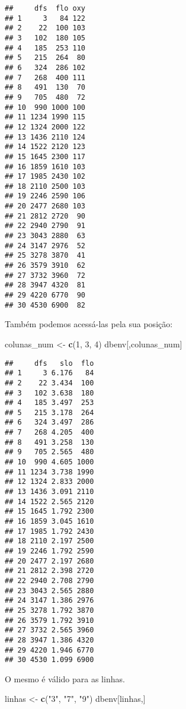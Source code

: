\documentclass[
]{book}
\newenvironment{Shaded}{\begin{snugshade}}{\end{snugshade}}
\newcommand{\DecValTok}[1]{\textcolor[rgb]{0.00,0.00,0.81}{#1}}
\newcommand{\KeywordTok}[1]{\textcolor[rgb]{0.13,0.29,0.53}{\textbf{#1}}}
\newcommand{\NormalTok}[1]{#1}
\newcommand{\StringTok}[1]{\textcolor[rgb]{0.31,0.60,0.02}{#1}}
\begin{document}
\begin{verbatim}
##     dfs  flo oxy
## 1     3   84 122
## 2    22  100 103
## 3   102  180 105
## 4   185  253 110
## 5   215  264  80
## 6   324  286 102
## 7   268  400 111
## 8   491  130  70
## 9   705  480  72
## 10  990 1000 100
## 11 1234 1990 115
## 12 1324 2000 122
## 13 1436 2110 124
## 14 1522 2120 123
## 15 1645 2300 117
## 16 1859 1610 103
## 17 1985 2430 102
## 18 2110 2500 103
## 19 2246 2590 106
## 20 2477 2680 103
## 21 2812 2720  90
## 22 2940 2790  91
## 23 3043 2880  63
## 24 3147 2976  52
## 25 3278 3870  41
## 26 3579 3910  62
## 27 3732 3960  72
## 28 3947 4320  81
## 29 4220 6770  90
## 30 4530 6900  82
\end{verbatim}

Também podemos acessá-las pela sua posição:

\begin{Shaded}
\begin{Highlighting}[]
\NormalTok{colunas_num <-}\StringTok{ }\KeywordTok{c}\NormalTok{(}\DecValTok{1}\NormalTok{, }\DecValTok{3}\NormalTok{, }\DecValTok{4}\NormalTok{)}
\NormalTok{dbenv[,colunas_num]}
\end{Highlighting}
\end{Shaded}

\begin{verbatim}
##     dfs   slo  flo
## 1     3 6.176   84
## 2    22 3.434  100
## 3   102 3.638  180
## 4   185 3.497  253
## 5   215 3.178  264
## 6   324 3.497  286
## 7   268 4.205  400
## 8   491 3.258  130
## 9   705 2.565  480
## 10  990 4.605 1000
## 11 1234 3.738 1990
## 12 1324 2.833 2000
## 13 1436 3.091 2110
## 14 1522 2.565 2120
## 15 1645 1.792 2300
## 16 1859 3.045 1610
## 17 1985 1.792 2430
## 18 2110 2.197 2500
## 19 2246 1.792 2590
## 20 2477 2.197 2680
## 21 2812 2.398 2720
## 22 2940 2.708 2790
## 23 3043 2.565 2880
## 24 3147 1.386 2976
## 25 3278 1.792 3870
## 26 3579 1.792 3910
## 27 3732 2.565 3960
## 28 3947 1.386 4320
## 29 4220 1.946 6770
## 30 4530 1.099 6900
\end{verbatim}

O mesmo é válido para as linhas.

\begin{Shaded}
\begin{Highlighting}[]
\NormalTok{linhas <-}\StringTok{ }\KeywordTok{c}\NormalTok{(}\StringTok{"3"}\NormalTok{, }\StringTok{"7"}\NormalTok{, }\StringTok{"9"}\NormalTok{)}
\NormalTok{dbenv[linhas,]}
\end{Highlighting}
\end{Shaded}
\end{document}
